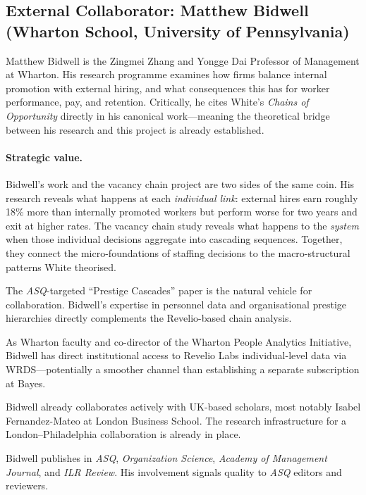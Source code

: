 \documentclass[a4paper]{tufte-handout}
\begin{document}
\subsection{External Collaborator: Matthew Bidwell (Wharton School, University of Pennsylvania)}


Matthew Bidwell is the Zingmei Zhang and Yongge Dai Professor of Management at Wharton.
His research programme examines how firms balance internal promotion with external hiring, and what consequences this has for worker performance, pay, and retention. Critically, he cites White's \emph{Chains of Opportunity} directly in his canonical work---meaning the theoretical bridge between his research and this project is already established.

\paragraph{Strategic value.}
Bidwell's work and the vacancy chain project are two sides of the same coin. His research reveals what happens at each \emph{individual link}: external hires earn roughly 18\% more than internally promoted workers but perform worse for two years and exit at higher rates. The vacancy chain study reveals what happens to the \emph{system} when those individual decisions aggregate into cascading sequences. Together, they connect the micro-foundations of staffing decisions to the macro-structural patterns White theorised.

\begin{description}[style=nextline, font=\normalfont\itshape]
	\item[Paper~2 co-author]
	      The \emph{ASQ}-targeted ``Prestige Cascades'' paper is the natural vehicle for collaboration. Bidwell's expertise in personnel data and organisational prestige hierarchies directly complements the Revelio-based chain analysis.
	\item[Revelio/WRDS access]
	      As Wharton faculty and co-director of the Wharton People Analytics Initiative, Bidwell has direct institutional access to Revelio Labs individual-level data via WRDS---potentially a smoother channel than establishing a separate subscription at Bayes.
	\item[Transatlantic infrastructure]
	      Bidwell already collaborates actively with UK-based scholars, most notably Isabel Fernandez-Mateo at London Business School. The research infrastructure for a London--Philadelphia collaboration is already in place.
	\item[Publication track record]
	      Bidwell publishes in \emph{ASQ}, \emph{Organization Science}, \emph{Academy of Management Journal}, and \emph{ILR Review}. His involvement signals quality to \emph{ASQ} editors and reviewers.
\end{description}
\end{document}
